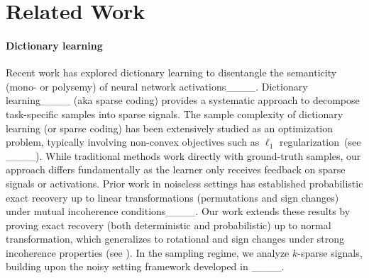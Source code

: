 \section{Related Work}
\paragraph{Dictionary learning}
Recent work has explored dictionary learning to disentangle the semanticity (mono- or polysemy) of neural network activations____. Dictionary learning____ (aka sparse coding) provides a systematic approach to decompose task-specific samples into sparse signals. The sample complexity of dictionary learning (or sparse coding) has been extensively studied as an optimization problem, typically involving non-convex objectives such as $\ell_1$ regularization~(see ____). While traditional methods work directly with ground-truth samples, our approach differs fundamentally as the learner only receives feedback on sparse signals or activations. Prior work in noiseless settings has established probabilistic exact recovery up to linear transformations (permutations and sign changes) under mutual incoherence conditions____. Our work extends these results by proving exact recovery (both deterministic and probabilistic) up to normal transformation, which generalizes to rotational and sign changes under strong incoherence properties (see ). In the sampling regime, we analyze $k$-sparse signals, building upon the noisy setting framework developed in ____. 


